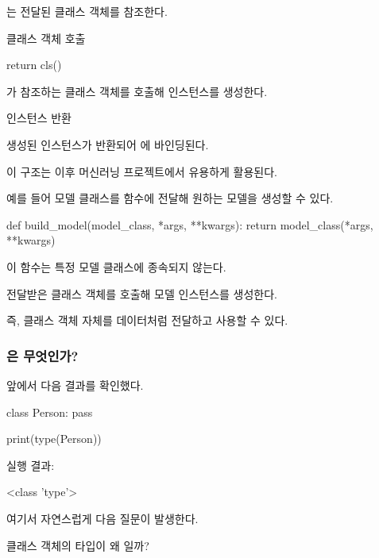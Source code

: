 는 전달된 클래스 객체를 참조한다.

\begin{dhknote}
\begin{dhksmry}[centered]
클래스 객체 호출
\end{dhksmry}
\end{dhknote}

\begin{dhkcode}
return cls()
\end{dhkcode}

가 참조하는 클래스 객체를 호출해 인스턴스를 생성한다.

\begin{dhknote}
\begin{dhksmry}[centered]
인스턴스 반환
\end{dhksmry}
\end{dhknote}

생성된 인스턴스가 반환되어 에 바인딩된다.

이 구조는 이후 머신러닝 프로젝트에서 유용하게 활용된다.

예를 들어 모델 클래스를 함수에 전달해 원하는 모델을 생성할 수 있다.

\begin{dhkcode}
def build_model(model_class, *args, **kwargs):
    return model_class(*args, **kwargs)
\end{dhkcode}


이 함수는 특정 모델 클래스에 종속되지 않는다.

전달받은 클래스 객체를 호출해 모델 인스턴스를 생성한다.

즉, 클래스 객체 자체를 데이터처럼 전달하고 사용할 수 있다.

\subsubsection{은 무엇인가?}

앞에서 다음 결과를 확인했다.

\begin{dhkcode}
class Person:
    pass

print(type(Person))
\end{dhkcode}

실행 결과:

\begin{dhkzsh}
<class 'type'>
\end{dhkzsh}

여기서 자연스럽게 다음 질문이 발생한다.

클래스 객체의 타입이 왜 일까?

